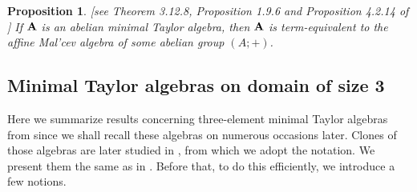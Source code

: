 \documentclass[11pt]{amsart}
\newcommand{\m}[1]{\mathbf{\uppercase{#1}}}
\newcommand{\n}{\scriptscriptstyle{\mathsf{N}}}
\newtheorem{prp}[thm]{Proposition}
\theoremstyle{definition}
\newtheorem{dfn}[thm]{Definition}
\theoremstyle{remark}
\theoremstyle{plain}
\begin{document}
\begin{prp}\label{mintayloraff}[see Theorem 3.12.8, Proposition 1.9.6 and Proposition 4.2.14 of \cite{Zebnotes}]
If $\m a$ is an abelian minimal Taylor algebra, then $\m a$ is term-equivalent to the affine Mal'cev algebra of some abelian group $(A;+)$.
\end{prp}

\subsection{Minimal Taylor algebras on domain of size 3}\label{s3elem}
Here we summarize results concerning three-element minimal Taylor algebras from \cite{Zebnotes} since we shall recall these algebras on numerous occasions later. Clones of those algebras are later studied in \cite{jankovec}, from which we adopt the notation. We present them the same as in \cite{jankovec}. Before that, to do this efficiently, we introduce a few notions. 
    
\end{document}
